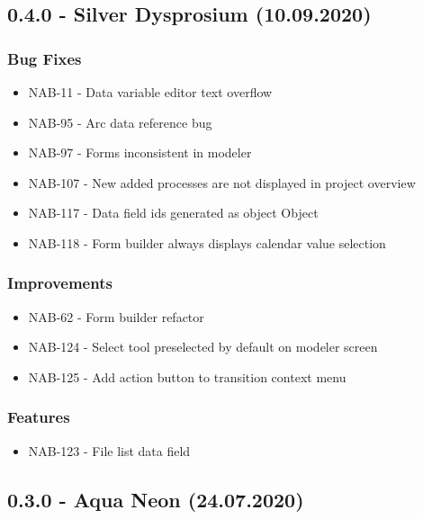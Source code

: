 \subsection*{0.4.0 - Silver Dysprosium (10.09.2020)}
  \subsubsection*{Bug Fixes}
    \begin{itemize}
      \item NAB-11 - Data variable editor text overflow
      \item NAB-95 - Arc data reference bug
      \item NAB-97 - Forms inconsistent in modeler
      \item NAB-107 - New added processes are not displayed in project overview
      \item NAB-117 - Data field ids generated as object Object
      \item NAB-118 - Form builder always displays calendar value selection
    \end{itemize}

  \subsubsection*{Improvements}
    \begin{itemize}
      \item NAB-62 - Form builder refactor
      \item NAB-124 - Select tool preselected by default on modeler screen
      \item NAB-125 - Add action button to transition context menu
    \end{itemize}

  \subsubsection*{Features}
    \begin{itemize}
      \item NAB-123 - File list data field
    \end{itemize}

\subsection*{0.3.0 - Aqua Neon (24.07.2020)}
